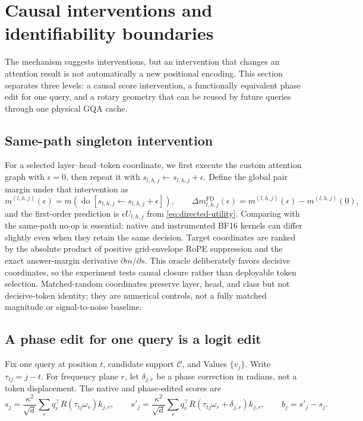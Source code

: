 \section{Causal interventions and identifiability boundaries}
\label{sec:method}

The mechanism suggests interventions, but an intervention that changes an
attention result is not automatically a new positional encoding.  This section
separates three levels: a causal score intervention, a functionally equivalent
phase edit for one query, and a rotary geometry that can be reused by future
queries through one physical GQA cache.

\subsection{Same-path singleton intervention}

For a selected layer--head--token coordinate, we first execute the custom
attention graph with $\epsilon=0$, then repeat it with
$s_{l,h,j}\leftarrow s_{l,h,j}+\epsilon$.  Define the global pair margin under
that intervention as
\begin{equation}
  m^{(l,h,j)}(\epsilon)
  =m\!\left(\operatorname{do}
  [s_{l,h,j}\leftarrow s_{l,h,j}+\epsilon]\right),
  \qquad
  \Delta m^{\mathrm{FD}}_{l,h,j}(\epsilon)
  =m^{(l,h,j)}(\epsilon)-m^{(l,h,j)}(0),
  \label{eq:finite-intervention}
\end{equation}
and the first-order prediction is $\epsilon U_{l,h,j}$ from
\cref{eq:directed-utility}.  Comparing with the same-path no-op is essential:
native and instrumented BF16 kernels can differ slightly even when they retain
the same decision.  Target coordinates are ranked by the absolute product of
positive grid-envelope RoPE suppression and the exact answer-margin derivative
$\partial m/\partial s$.  This oracle deliberately favors decisive coordinates,
so the experiment tests causal closure rather than deployable token selection.
Matched-random coordinates preserve layer, head, and class but not decisive-token
identity; they are numerical controls, not a fully matched magnitude or
signal-to-noise baseline.

\subsection{A phase edit for one query is a logit edit}

Fix one query at position $t$, candidate support $\mathcal C$, and Values
$\{v_j\}$.  Write $\tau_{tj}=j-t$.  For frequency plane $r$, let
$\delta_{j,r}$ be a phase correction in radians, not a token displacement.
The native and phase-edited scores are
\begin{equation}
  s_j=\frac{\kappa^2}{\sqrt d}\sum_r
  q_r^\top R(\tau_{tj}\omega_r)k_{j,r},
  \qquad
  s'_j=\frac{\kappa^2}{\sqrt d}\sum_r
  q_r^\top R(\tau_{tj}\omega_r+\delta_{j,r})k_{j,r},
  \qquad
  b_j=s'_j-s_j.
  \label{eq:phase-bias}
\end{equation}

